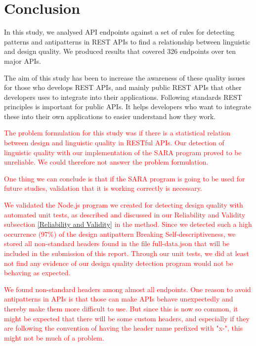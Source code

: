 \section{Conclusion}

In this study, we analysed API endpoints against a set of rules for detecting patterns and antipatterns in REST APIs to find a relationship between linguistic and design quality. We produced results that covered 326 endpoints over ten major APIs. 

The aim of this study has been to increase the awareness of these quality issues for those who develops REST APIs, and mainly public REST APIs that other developers uses to integrate into their applications. Following standards REST principles is important for public APIs.  It helps developers who want to integrate these into their own applications to easier understand how they work.

\textcolor{red}{
The problem  formulation for this study was if there is a statistical relation between design and linguistic quality in RESTful APIs. Our detection of linguistic quality with our implementation of the SARA program proved to be unreliable. We could therefore not answer the problem formulation. 
}

\textcolor{red}{
One thing we can conclude is that if the SARA program is going to be used for future studies, validation that it is working correctly is necessary.
}

\textcolor{red}{
We validated the Node.js program we created for detecting design quality with automated unit tests, as described and discussed in our Reliability and Validity subsection \ref{Reliability and Validity} in the method. Since we detected such a high occurrence (97\%) of the design antipattern Breaking Self-descriptiveness, we stored all non-standard headers found in the file full-data.json that will be included in the submission of this report. Through our unit tests, we did at least not find any evidence of our design quality detection program would not be behaving as expected. 
}

\textcolor{red}{
We found non-standard headers among almost all endpoints. One reason to avoid antipatterns in APIs is that those can make APIs behave unexpectedly and thereby make them more difficult to use. But since this is now so common, it might be expected that there will be some custom headers, and especially if they are following the convention of having the header name prefixed with "x-", this might not be much of a problem.
}

